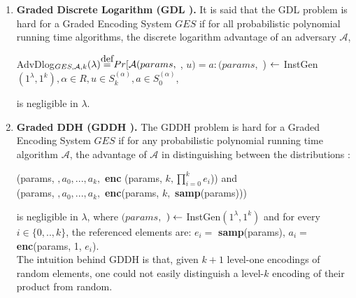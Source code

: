 \begin{enumerate}
	\item \textbf{Graded Discrete Logarithm (GDL \cite{GGH13}).} It is said that the GDL problem is hard for a Graded Encoding System $GES$ if for all probabilistic polynomial running time algorithms, the discrete logarithm advantage of an adversary $\mathcal{A}$,
	
	\begin{center}
		AdvDlog$_{GES, \mathcal{A}, k}(\lambda) \stackrel{\mathclap{\normalfont\mbox{def}}}{=} Pr[\mathcal{A}(params,$ {\pzt}, $u) = a : (params, $ {\pzt}) $\leftarrow$ InstGen$(1^\lambda, 1^k), \alpha\in R, u \in S_k^{(\alpha)}, a\in S_0^{(\alpha)} $,
	\end{center}

	is negligible in $\lambda$.
	
	\item \textbf{Graded DDH (GDDH \cite{GGH13}). } The GDDH problem is hard for a Graded Encoding System $GES$ if for any probabilistic polynomial running time algorithm $\mathcal{A}$, the advantage of $\mathcal{A}$ in distinguishing between the distributions :
	
	\begin{center}
		(params, {\pzt}$, a_0, ... ,a_k,$ \textbf{enc} (params, $k, \displaystyle{\prod_{i=0}^{k} e_i}$)) and \\
		(params, {\pzt}$, a_0, ... ,a_k,$ \textbf{enc}(params, $k,$ \textbf{samp}(params)))
	\end{center}
	is negligible in $\lambda$, where $(params, $ {\pzt} $)\leftarrow$ InstGen$(1^\lambda, 1^k)$ and for every $i \in \{0,..,k\}$, the referenced elements are: $e_i =$ \textbf{samp}(params), $a_i = $ \textbf{enc}(params, 1, $e_i$). \\
	
	The intuition behind GDDH is that, given $k + 1$ level-one encodings of random elements, one could not easily distinguish a level-$k$ encoding of their product from random.
	
	
\end{enumerate}
